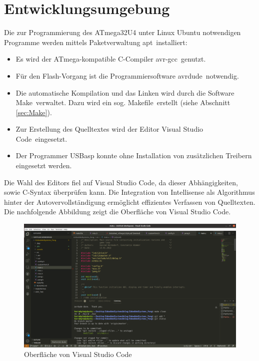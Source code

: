 
\section{Entwicklungsumgebung}
\label{sec:IDE}
Die zur Programmierung des ATmega32U4 unter Linux Ubuntu notwendigen Programme werden mittels Paketverwaltung \glqq apt\grqq\ installiert:
\begin{itemize}
\item Es wird der ATmega-kompatible C-Compiler \glqq avr-gcc\grqq\ genutzt.
\item Für den Flash-Vorgang ist die Programmiersoftware \glqq avrdude\grqq\ notwendig.
\item Die automatische Kompilation und das Linken wird durch die Software \glqq Make\grqq\ verwaltet. Dazu wird ein sog. \glqq Makefile\grqq\ erstellt (siehe Abschnitt \ref{sec:Make}).
\item Zur Erstellung des Quelltextes wird der Editor \glqq Visual Studio Code\grqq\ eingesetzt.
\item Der Programmer USBasp konnte ohne Installation von zusätzlichen Treibern eingesetzt werden.
\end{itemize}
\noindent Die Wahl des Editors fiel auf Visual Studio Code, da dieser Abhängigkeiten, sowie C-Syntax überprüfen kann. Die Integration von Intellisense als Algorithmus hinter der Autovervollständigung ermöglicht effizientes Verfassen von Quelltexten. Die nachfolgende Abbildung zeigt die Oberfläche von Visual Studio Code.

\begin{figure}[H]
\includegraphics[width=\textwidth]{./Bilder/Code.png}
\caption{Oberfläche von Visual Studio Code}
\end{figure}


